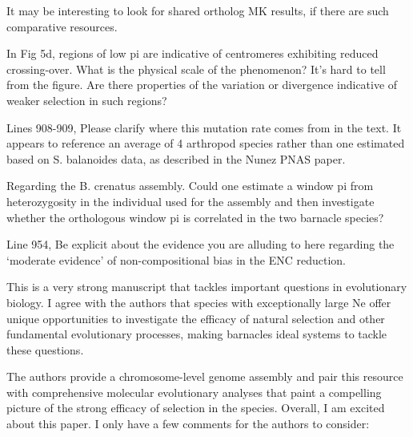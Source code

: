
\begin{point}{} %
It may be interesting to look for shared ortholog MK results, if there
are such comparative resources.
\end{point}


\begin{point}{} %
In Fig 5d, regions of low pi are indicative of centromeres exhibiting
reduced crossing-over. What is the physical scale of the phenomenon? It's
hard to tell from the figure. Are there properties of the variation or
divergence indicative of weaker selection in such regions?
\end{point}


\begin{point}{} %
Lines 908-909, Please clarify where this mutation rate comes from in the
text. It appears to reference an average of 4 arthropod species rather
than one estimated based on S. balanoides data, as described in the Nunez
PNAS paper.
\end{point}


\begin{point}{} %
Regarding the B. crenatus assembly. Could one estimate a window pi from
heterozygosity in the individual used for the assembly and then
investigate whether the orthologous window pi is correlated in the two
barnacle species?
\end{point}


\begin{point}{} %
Line 954, Be explicit about the evidence you are alluding to here
regarding the `moderate evidence' of non-compositional bias in the ENC
reduction.
\end{point}




\begin{itquote}
This is a very strong manuscript that tackles important questions in
evolutionary biology. I agree with the authors that species with
exceptionally large Ne offer unique opportunities to investigate the
efficacy of natural selection and other fundamental evolutionary
processes, making barnacles ideal systems to tackle these questions.

The authors provide a chromosome-level genome assembly and pair this
resource with comprehensive molecular evolutionary analyses that paint a
compelling picture of the strong efficacy of selection in the species.
Overall, I am excited about this paper. I only have a few comments for
the authors to consider:
\end{itquote}

